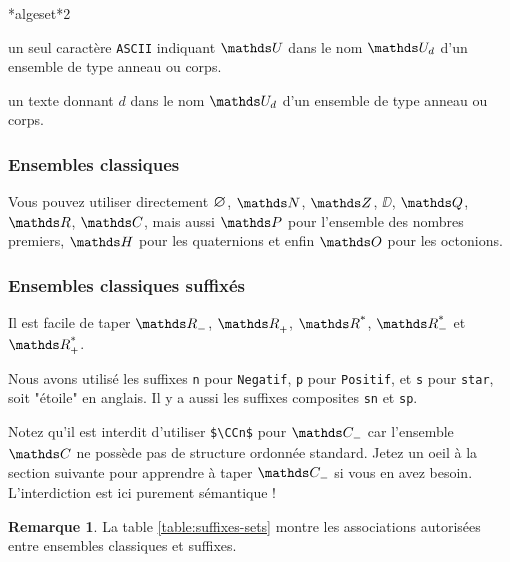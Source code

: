 \documentclass[12pt,a4paper]{article}
\makeatletter
\theoremstyle{definition}
\newtheorem*{remark}{Remarque}
\newcommand\ascii{\texttt{ASCII}}
\newcommand\IDmacro{\@ifstar{\@IDmacro@star}{\@IDmacro@no@star}}
\newcommand\@IDmacro@no@star[3]{%
    \texttt{%
    	\textbackslash#1 <macro>%
    	\IfStrEq{#2}{0}{}{%
    		\,\,[#2 Option%
				\IfStrEq{#2}{1}{}{s}]%
			}%
	    \IfStrEq{#3}{}{}{%
	    		\,\,(#3 Argument%
				\IfStrEq{#3}{1}{}{s})%
			}
	   	}
    \immediate\write\tempfile{macro,#1,#2,#3}%
}
\newcommand\@IDmacro@star[2]{%
    \@IDmacro@no@star{#1}{0}{#2}%
}
\newcommand\@IDoptarg{\@ifstar{\@IDoptarg@star}{\@IDoptarg@no@star}}
\newcommand\@IDoptarg@star[2]{%
	\vspace{0.5em}
	\textbf{---} \texttt{#1%
		\IfStrEq{#2}{}{:}{\,#2:}%
	}%
}
\newcommand\@IDoptarg@no@star[2]{%
	\IfStrEq{#2}{}{%
		\@IDoptarg@star{#1}{}%
	}{%
		\@IDoptarg@star{#1}{#2}%
	}%
}
\newcommand\IDarg[1]{%
	\@IDoptarg{Argument}{#1}%
}
\makeatother
\begin{document}
\bigskip


\IDmacro*{algeset*}{2}

\IDarg{1} un seul caractère \ascii{} indiquant $\algeset{U}$ dans le nom $\algeset*{U}{d}$ d'un ensemble de type anneau ou corps.

\IDarg{2} un texte donnant $d$ dans le nom $\algeset*{U}{d}$ d'un ensemble de type anneau ou corps.



\subsubsection{Ensembles classiques}

\begin{tcblisting}{}
Vous pouvez utiliser directement $\nullset$, $\NN$, $\ZZ$, $\DD$, $\QQ$, $\RR$, $\CC$,
mais aussi $\PP$ pour l'ensemble des nombres premiers, $\HH$ pour les quaternions et
enfin $\OO$ pour les octonions.
\end{tcblisting}



\subsubsection{Ensembles classiques suffixés}

\begin{tcblisting}{}
Il est facile de taper $\RRn$, $\RRp$, $\RRs$, $\RRsn$ et $\RRsp$.
\end{tcblisting}


Nous avons utilisé les suffixes \verb+n+ pour \verb+Negatif+, \verb+p+ pour \verb+Positif+, et \verb+s+ pour \verb+star+, soit "étoile" en anglais. Il y a aussi les suffixes composites \verb+sn+ et \verb+sp+.

\medskip

Notez qu'il est interdit d'utiliser \verb+$\CCn$+ pour $\specialset{\CC}{n}$ car l'ensemble $\CC$ ne possède pas de structure ordonnée standard. Jetez un oeil à la section suivante pour apprendre à taper $\specialset{\CC}{n}$ si vous en avez besoin. L'interdiction est ici purement sémantique !

\medskip

\begin{remark}
	La table \ref{table:suffixes-sets}  montre les associations autorisées entre ensembles classiques et suffixes.
\end{remark}

\end{document}
